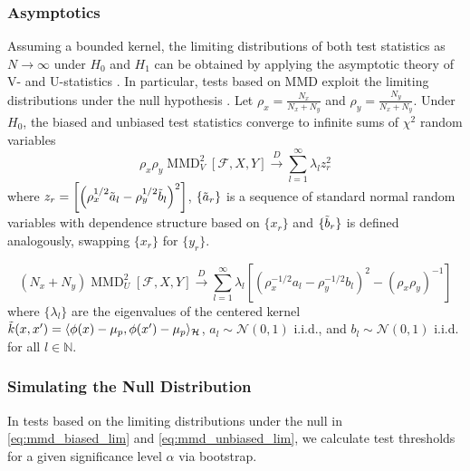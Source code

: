 \documentclass[a4paper,11pt]{article}
\begin{document}
\subsubsection{Asymptotics}
Assuming a bounded kernel, the limiting distributions of both test statistics as $N \rightarrow \infty$ under $H_{0}$ and $H_{1}$ can be obtained by applying the asymptotic theory of V- and U-statistics \cite{serfling_approximation_2002}. In particular, tests based on MMD exploit the limiting distributions under the null hypothesis \cite{gretton_kernel_2012, chwialkowski_wild_2016}. Let $\rho_{x} =\frac{N_{x}}{N_{x} + N_{y}}$ and $\rho_{y} = \frac{N_{y}}{N_{x} + N_{y}}$. Under $H_{0}$, the biased and unbiased test statistics converge to infinite sums of $\chi^{2}$ random variables
\begin{equation}
    \rho_{x}\rho_{y} \operatorname{MMD}_{V}^{2}[\mathcal{F}, X, Y] \overset{D}{\rightarrow} \sum_{l=1}^{\infty} \lambda_{l}z_{r}^{2}
    \label{eq:mmd_biased_lim}
\end{equation}
where $z_{r} = \left[\left(\rho_{x}^{1 / 2} \Tilde{a}_{l}-\rho_{y}^{1 / 2} \Tilde{b}_{l}\right)^{2}\right]$, $\{\Tilde{a}_{r}\}$ is a sequence of standard normal random variables with dependence structure based on $\{x_{r}\}$ and $\{\Tilde{b}_{r}\}$ is defined analogously, swapping $\{x_{r}\}$ for $\{y_{r}\}$.

\begin{equation}
    (N_{x}+N_{y}) \operatorname{MMD}_{U}^{2}[\mathcal{F}, X, Y] \overset{D}{\rightarrow} \sum_{l=1}^{\infty} \lambda_{l}\left[\left(\rho_{x}^{-1 / 2} a_{l}-\rho_{y}^{-1 / 2} b_{l}\right)^{2}-\left(\rho_{x} \rho_{y}\right)^{-1}\right]
    \label{eq:mmd_unbiased_lim}
\end{equation}
where $\{\lambda_{l}\}$ are the eigenvalues of the centered kernel $\Tilde{k}(x, x') = \langle \phi(x) - \mathbf{\mu}_{p}, \phi(x') - \mathbf{\mu}_{p} \rangle_{\mathcal{H}}$, $a_{l} \sim \mathcal{N}(0, 1)$ i.i.d., and $b_{l} \sim \mathcal{N}(0, 1)$ i.i.d. for all $l \in \mathbb{N}$.

\subsubsection{Simulating the Null Distribution}
In tests based on the limiting distributions under the null in \ref{eq:mmd_biased_lim} and \ref{eq:mmd_unbiased_lim}, we calculate test thresholds for a given significance level $\alpha$ via bootstrap.
\end{document}
